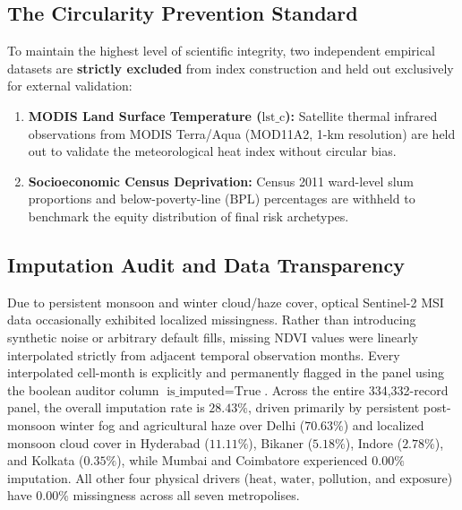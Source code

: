 \subsection{The Circularity Prevention Standard}
To maintain the highest level of scientific integrity, two independent empirical datasets are \textbf{strictly excluded} from index construction and held out exclusively for external validation:
\begin{enumerate}
    \item \textbf{MODIS Land Surface Temperature ($\text{lst\_c}$):} Satellite thermal infrared observations from MODIS Terra/Aqua (MOD11A2, 1-km resolution) \citep{van2013modis} are held out to validate the meteorological heat index without circular bias.
    \item \textbf{Socioeconomic Census Deprivation:} Census 2011 ward-level slum proportions and below-poverty-line ($\text{BPL}$) percentages are withheld to benchmark the equity distribution of final risk archetypes.
\end{enumerate}

\subsection{Imputation Audit and Data Transparency}
Due to persistent monsoon and winter cloud/haze cover, optical Sentinel-2 MSI data occasionally exhibited localized missingness. Rather than introducing synthetic noise or arbitrary default fills, missing NDVI values were linearly interpolated strictly from adjacent temporal observation months. Every interpolated cell-month is explicitly and permanently flagged in the panel using the boolean auditor column $\text{is\_imputed} = \text{True}$. Across the entire 334,332-record panel, the overall imputation rate is $28.43\%$, driven primarily by persistent post-monsoon winter fog and agricultural haze over Delhi ($70.63\%$) and localized monsoon cloud cover in Hyderabad ($11.11\%$), Bikaner ($5.18\%$), Indore ($2.78\%$), and Kolkata ($0.35\%$), while Mumbai and Coimbatore experienced $0.00\%$ imputation. All other four physical drivers ($\text{heat}$, $\text{water}$, $\text{pollution}$, and $\text{exposure}$) have $0.00\%$ missingness across all seven metropolises.
